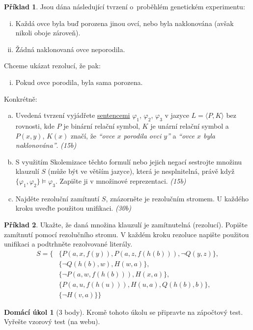 \documentclass[a4paper]{article}
\theoremstyle{definition}
\newtheorem{problem}{Příklad}
\newtheorem*{ukol}{Domácí úkol}
\begin{document}
\medskip\begin{problem}
Jsou dána následující tvrzení o~proběhlém genetickém experimentu:
\begin{enumerate}[(i)]
    \item Každá ovce byla buď porozena jinou ovcí, nebo byla naklonována (avšak nikoli oboje zároveň).
    \item Žádná naklonovaná ovce neporodila.
\end{enumerate}
Chceme ukázat rezolucí, že pak:
\begin{enumerate}[(iii)]
    \item Pokud ovce porodila, byla sama porozena.
\end{enumerate}
Konkrétně:
\begin{enumerate}[(a)]
    \item Uvedená tvrzení vyjádřete \underline{sentencemi} $\varphi_1$, $\varphi_2$, $\varphi_3$ v jazyce $L=\langle P,K\rangle$ bez rovnosti, kde $P$ je binární relační symbol, $K$ je unární relační symbol a $P(x,y)$, $K(x)$ značí, že \emph{``ovce $x$ porodila ovci $y$''} a \emph{``ovce $x$ byla naklonována''}. {\it (15b)}    
    \item S využitím Skolemizace těchto formulí nebo jejich negací sestrojte množinu klauzulí $S$ (může být ve větším jazyce), která je nesplnitelná, právě když  $\{\varphi_1, \varphi_2\} \models \varphi_3$. Zapište ji v množinové reprezentaci. {\it (15b)}
    \item Najděte rezoluční zamítnutí $S$, znázorněte je rezolučním stromem. U každého kroku uveďte použitou unifikaci. {\it (30b)}
\end{enumerate}
\end{problem}
        
    
\medskip\begin{problem}
    Ukažte, že daná množina klauzulí je zamítnutelná (rezolucí). Popište zamítnutí pomocí rezolučního stromu. V každém kroku rezoluce napište použitou unifikaci a podtrhněte rezolvované literály.
    \begin{align*}
        S=\{
            &\{P(a,x,f(y)),P(a,z,f(h(b))),\neg Q(y,z)\},\\
            &\{\neg Q(h(b),w),H(w,a)\},\\
            &\{\neg P(a,w,f(h(b))),H(x,a)\},\\
            &\{P(a,u,f(h(u))),H(u,a),Q(h(b),b)\},\\
            &\{\neg H(v,a)\}
        \}
    \end{align*}
\end{problem}


\medskip\begin{ukol}[3 body]


Kromě tohoto úkolu se připravte na zápočtový test. Vyřešte vzorový test (na webu).
\end{ukol}
\end{document}
